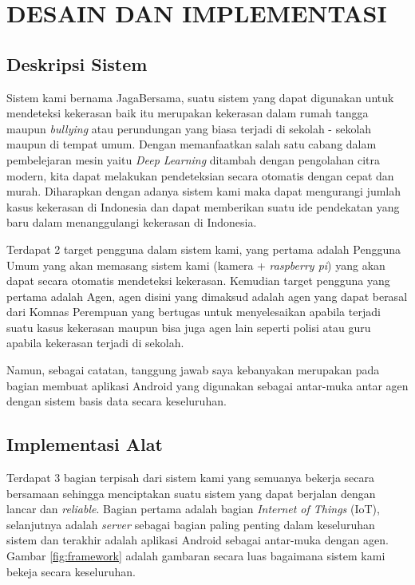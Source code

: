 \chapter{DESAIN DAN IMPLEMENTASI}


\section{Deskripsi Sistem}

Sistem kami bernama JagaBersama, suatu sistem yang dapat digunakan untuk mendeteksi kekerasan baik itu merupakan kekerasan dalam rumah tangga maupun \textit{bullying} atau perundungan yang biasa terjadi di sekolah - sekolah maupun di tempat umum. Dengan memanfaatkan salah satu cabang dalam pembelejaran mesin yaitu \textit{Deep Learning} ditambah dengan pengolahan citra modern, kita dapat melakukan pendeteksian secara otomatis dengan cepat dan murah. Diharapkan dengan adanya sistem kami maka dapat mengurangi jumlah kasus kekerasan di Indonesia dan dapat memberikan suatu ide pendekatan yang baru dalam menanggulangi kekerasan di Indonesia.

Terdapat 2 target pengguna dalam sistem kami, yang pertama adalah Pengguna Umum yang akan memasang sistem kami (kamera + \textit{raspberry pi}) yang akan dapat secara otomatis mendeteksi kekerasan. Kemudian target pengguna yang pertama adalah Agen, agen disini yang dimaksud adalah agen yang dapat berasal dari Komnas Perempuan yang bertugas untuk menyelesaikan apabila terjadi suatu kasus kekerasan maupun bisa juga agen lain seperti polisi atau guru apabila kekerasan terjadi di sekolah.

Namun, sebagai catatan, tanggung jawab saya kebanyakan merupakan pada bagian membuat aplikasi Android yang digunakan sebagai antar-muka antar agen dengan sistem basis data secara keseluruhan.

\section{Implementasi Alat}

Terdapat 3 bagian terpisah dari sistem kami yang semuanya bekerja secara bersamaan sehingga menciptakan suatu sistem yang dapat berjalan dengan lancar dan \textit{reliable}. Bagian pertama adalah bagian \textit{Internet of Things} (IoT), selanjutnya adalah \textit{server} sebagai bagian paling penting dalam keseluruhan sistem dan terakhir adalah aplikasi Android sebagai antar-muka dengan agen. Gambar \ref{fig:framework} adalah gambaran secara luas bagaimana sistem kami bekeja secara keseluruhan.



